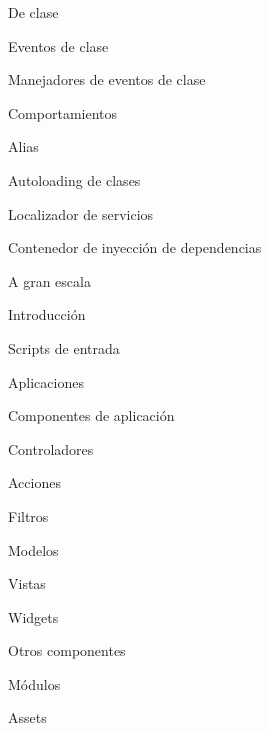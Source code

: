 \begin{longenum}
\begin{longenum}
\begin{longenum}
\begin{longenum}
\begin{longenum}
\begin{longenum}
\begin{longenum}
                        \end{longenum}
                        \item De clase
                        \begin{longenum}
                            \item Eventos de clase
                            \item Manejadores de eventos de clase
                        \end{longenum}
                    \end{longenum}
                    \item Comportamientos
                \end{longenum}
            \end{longenum}
            \item Alias
            \item Autoloading de clases
            \item Localizador de servicios
            \item Contenedor de inyección de dependencias
        \end{longenum}
        \item A gran escala
        \begin{longenum}
            \item Introducción
            \item Scripts de entrada
            \item Aplicaciones
            \item Componentes de aplicación
            \item Controladores
            \begin{longenum}
                \item Acciones
                \item Filtros
            \end{longenum}
            \item Modelos
            \item Vistas
            \begin{longenum}
                \item Widgets
            \end{longenum}
            \item Otros componentes
            \begin{longenum}
                \item Módulos
                \item Assets

\end{longenum}
\end{longenum}
\end{longenum}
\end{longenum}
